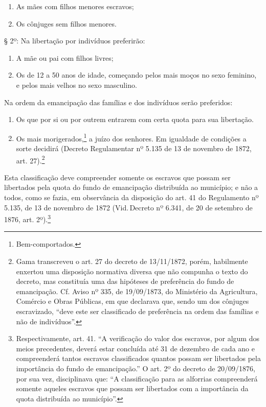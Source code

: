 {\begin{enumerate}[label={\scshape\roman*.}]
\item As mães com filhos menores escravos;

\item Os cônjuges sem filhos menores.
\end{enumerate}

§ 2º: Na libertação por indivíduos preferirão:

\begin{enumerate}[label={\scshape\roman*.}]
\item A mãe ou pai com filhos livres;

\item Os de 12 a 50 anos de idade, começando pelos mais moços no sexo
feminino, e pelos mais velhos no sexo masculino.
\end{enumerate}

Na ordem da emancipação das famílias e dos indivíduos serão preferidos:

\begin{enumerate}[label=\arabic*º]
\item Os que por si ou por outrem entrarem com certa quota para sua
libertação.

\item Os mais morigerados,\footnote{Bem-comportados.} a juízo dos
senhores. Em igualdade de condições a sorte decidirá (Decreto
Regulamentar nº 5.135 de 13 de novembro de 1872, art. 27).\footnote{
  Gama transcreveu o art. 27 do decreto de 13/11/1872, porém, habilmente
  enxertou uma disposição normativa diversa que não compunha o texto do
  decreto, mas constituía uma das hipóteses de preferência do
  fundo de emancipação. Cf. Aviso nº 335, de 19/09/1873, do Ministério
  da Agricultura, Comércio e Obras Públicas, em que declarava que, sendo
  um dos cônjuges escravizado, ``deve este ser classificado de
  preferência na ordem das famílias e não de indivíduos''.}
\end{enumerate}  

Esta classificação deve compreender somente os escravos que possam ser
libertados pela quota do fundo de emancipação distribuída ao município;
e não a todos, como se fazia, em observância da disposição do art. 41 do
Regulamento nº 5.135, de 13 de novembro de 1872 (Vid.\,Decreto nº 6.341,
de 20 de setembro de 1876, art. 2º).\footnote{Respectivamente, art.
  41. ``A verificação do valor dos escravos, por algum dos meios
  precedentes, deverá estar concluída até 31 de dezembro de cada ano e
  compreenderá tantos escravos classificados quantos possam ser
  libertados pela importância do fundo de emancipação.'' O art. 2º do
  decreto de 20/09/1876, por sua vez, disciplinava que: ``A classificação
  para as alforrias compreenderá somente aqueles escravos que possam ser
  libertados com a importância da quota distribuída ao município''.}

}
